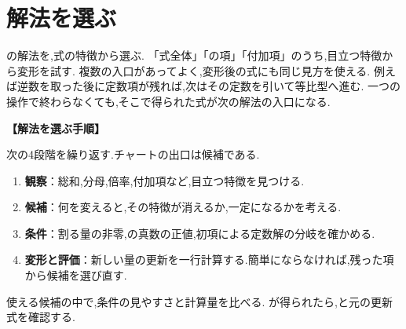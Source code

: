 
\section{解法を選ぶ}\label{節：解法を選ぶ}

の解法を,式の特徴から選ぶ.
「式全体」「の項」「付加項」のうち,目立つ特徴から変形を試す.
複数の入口があってよく,変形後の式にも同じ見方を使える.
例えば逆数を取った後に定数項が残れば,次はその定数を引いて等比型へ進む.
一つの操作で終わらなくても,そこで得られた式が次の解法の入口になる.

\noindent\textbf{【解法を選ぶ手順】}\par
次の4段階を繰り返す.チャートの出口は候補である.
\begin{enumerate}
  \item \textbf{観察}：総和,分母,倍率,付加項など,目立つ特徴を見つける.
  \item \textbf{候補}：何を変えると,その特徴が消えるか,一定になるかを考える.
  \item \textbf{条件}：割る量の非零,の真数の正値,初項による定数解の分岐を確かめる.
  \item \textbf{変形と評価}：新しい量の更新を一行計算する.簡単にならなければ,残った項から候補を選び直す.
\end{enumerate}
使える候補の中で,条件の見やすさと計算量を比べる.
が得られたら,と元の更新式を確認する.
\BookFigFlowchart

